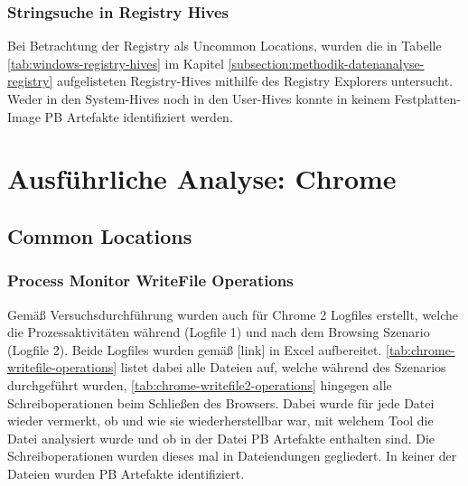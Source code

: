 \begin{appendices}
		
		\subsubsection*{Stringsuche in Registry Hives}
		Bei Betrachtung der Registry als Uncommon Locations, wurden die in Tabelle \ref{tab:windows-registry-hives} im Kapitel \ref{subsection:methodik-datenanalyse-registry} aufgelisteten Registry-Hives mithilfe des Registry Explorers untersucht. 
		Weder in den System-Hives noch in den User-Hives konnte in keinem Festplatten-Image PB Artefakte identifiziert werden. 

\section{Ausführliche Analyse: Chrome}
\subsection{Common Locations}
\label{subsection:appendix-chrome-common-locations}
\subsubsection*{Process Monitor WriteFile Operations}
\label{subsubsection:appendix-chrome-common-locations-writefile-operations}

Gemäß Versuchsdurchführung wurden auch für Chrome 2 Logfiles erstellt, welche die Prozessaktivitäten während (Logfile 1) und nach dem Browsing Szenario (Logfile 2). Beide Logfiles wurden gemäß [link] in Excel aufbereitet. \autoref{tab:chrome-writefile-operations} listet dabei alle Dateien auf, welche während des Szenarios durchgeführt wurden, \autoref{tab:chrome-writefile2-operations} hingegen alle Schreiboperationen beim Schließen des Browsers. Dabei wurde für jede Datei wieder vermerkt, ob und wie sie wiederherstellbar war, mit welchem Tool die Datei analysiert wurde und ob in der Datei PB Artefakte enthalten sind. Die Schreiboperationen wurden dieses mal in Dateiendungen gegliedert. In keiner der Dateien wurden PB Artefakte identifiziert.


\end{appendices}
